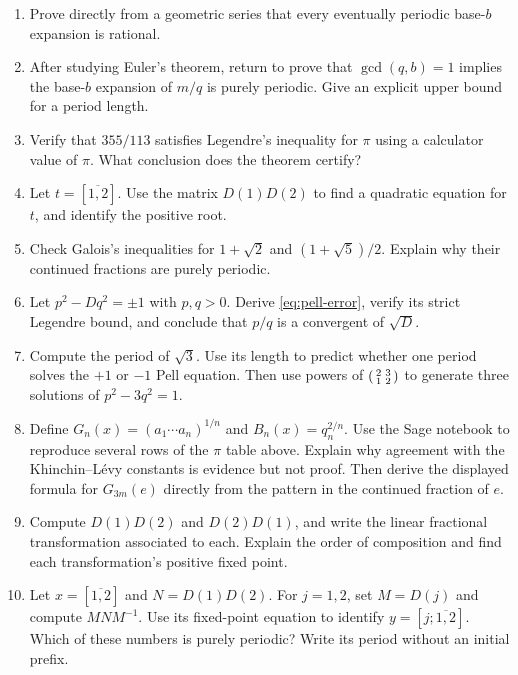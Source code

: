 \begin{exercisebox}
\begin{enumerate}
  \item Prove directly from a geometric series that every eventually periodic
  base-$b$ expansion is rational. 
  \item After studying Euler's theorem, return to prove that $\gcd(q,b)=1$
  implies the base-$b$ expansion of $m/q$ is purely periodic. Give an explicit
  upper bound for a period length. 
  \item Verify that $355/113$ satisfies Legendre's inequality for $\pi$ using
  a calculator value of $\pi$. What conclusion does the theorem certify?
  \item Let $t=[\overline{1,2}]$. Use the matrix $D(1)D(2)$ to find a quadratic
  equation for $t$, and identify the positive root. 
  \item Check Galois's inequalities for $1+\sqrt2$ and
  $(1+\sqrt5)/2$. Explain why their continued fractions are purely periodic.
  \item Let $p^2-Dq^2=\pm1$ with $p,q>0$. Derive
  \eqref{eq:pell-error}, verify its strict Legendre bound, and conclude that
  $p/q$ is a convergent of $\sqrt D$. 
  \item Compute the period of $\sqrt3$. Use its length to predict whether one
  period solves the $+1$ or $-1$ Pell equation. Then use powers of
  $\begin{psmallmatrix}2&3\\1&2\end{psmallmatrix}$ to generate three solutions
  of $p^2-3q^2=1$. 
  \item Define $G_n(x)=(a_1\cdots a_n)^{1/n}$ and $B_n(x)=q_n^{2/n}$.
  Use the Sage notebook to reproduce several rows of the $\pi$ table above.
  Explain why agreement with the Khinchin--L\'evy constants is evidence but
  not proof. Then derive the displayed formula for $G_{3m}(e)$ directly from
  the pattern in the continued fraction of $e$. 
  \item Compute $D(1)D(2)$ and $D(2)D(1)$, and write the linear
  fractional transformation associated to each. Explain the order of
  composition and find each transformation's positive fixed point.
  \item Let $x=[\overline{1,2}]$ and $N=D(1)D(2)$. For $j=1,2$, set
  $M=D(j)$ and compute $MNM^{-1}$. Use its fixed-point equation to
  identify $y=[j;\overline{1,2}]$. Which of these numbers is purely
  periodic? Write its period without an initial prefix.

\end{enumerate}
\end{exercisebox}
